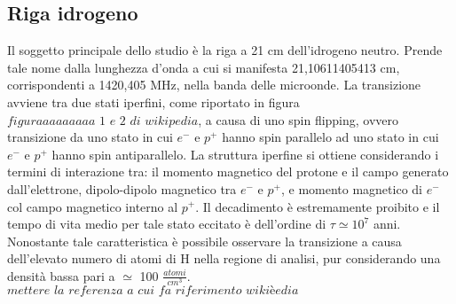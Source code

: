 \subsection{Riga idrogeno}
Il soggetto principale dello studio è la riga a 21 cm dell'idrogeno neutro. Prende tale nome dalla lunghezza d'onda a cui si manifesta 21,10611405413 cm, corrispondenti a 1420,405 MHz, nella banda delle microonde. La transizione avviene tra due stati iperfini, come riportato in figura $\textit{figuraaaaaaaaa 1 e 2 di wikipedia}$, a causa di uno spin flipping, ovvero transizione da uno stato in cui $e^{-}$ e $p^{+}$ hanno spin parallelo ad uno stato in cui $e^{-}$ e $p^{+}$ hanno spin antiparallelo. La struttura iperfine si ottiene considerando i termini di interazione tra: il momento magnetico del protone e il campo generato dall'elettrone, dipolo-dipolo magnetico tra $e^{-}$ e $p^{+}$, e momento magnetico di $e^{-}$ col campo magnetico interno al $p^{+}$.
Il decadimento è estremamente proibito e il tempo di vita medio per tale stato eccitato è dell'ordine di $\tau \simeq 10 ^{7}$  anni.
Nonostante tale caratteristica è possibile osservare la transizione  a causa dell'elevato numero di atomi di H nella regione di analisi, pur considerando una densità bassa pari a $\simeq$ 100 $\frac{atomi}{cm^{3}}$. $\textit{mettere la referenza a cui fa riferimento wikièedia}$



